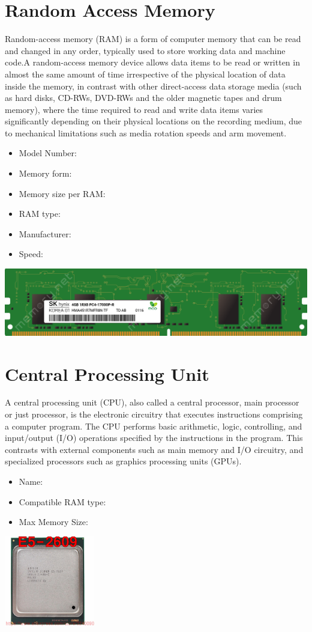 \documentclass{article}
\begin{document}
\section{Random Access Memory}
Random-access memory (RAM) is a form of computer memory that can be read and changed in any order, typically used to store working data and machine code.A random-access memory device allows data items to be read or written in almost the same amount of time irrespective of the physical location of data inside the memory, in contrast with other direct-access data storage media (such as hard disks, CD-RWs, DVD-RWs and the older magnetic tapes and drum memory), where the time required to read and write data items varies significantly depending on their physical locations on the recording medium, due to mechanical limitations such as media rotation speeds and arm movement.
\begin{itemize}
  \item Model Number:
  \item Memory form:
  \item Memory size per RAM:
  \item RAM type:
  \item Manufacturer:
  \item Speed:
\end{itemize}
\href{https://www.datasheets360.com/pdf/4058231500629532296}{\includegraphics[width=\textwidth]{RAM.png}}
\section{Central Processing Unit}
A central processing unit (CPU), also called a central processor, main processor or just processor, is the electronic circuitry that executes instructions comprising a computer program. The CPU performs basic arithmetic, logic, controlling, and input/output (I/O) operations specified by the instructions in the program. This contrasts with external components such as main memory and I/O circuitry, and specialized processors such as graphics processing units (GPUs).
\begin{itemize}
  \item Name:
  \item Compatible RAM type:
  \item Max Memory Size:
\end{itemize}
\href{http://static6.arrow.com/aropdfconversion/bc27610082f0c9042063be09408c62b0895fa247/pgurl_5465333946064300.pdf}{\includegraphics[height=4cm]{CPU.jpg}}
\end{document}

